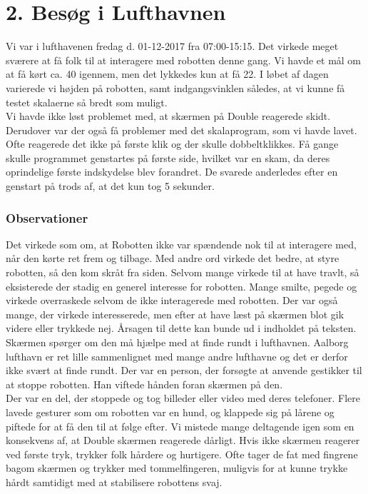 \section{2. Besøg i Lufthavnen}
\label{TestAfSkalaLufthavnsBesog}
%
Vi var i lufthavenen fredag d. 01-12-2017 fra 07:00-15:15. Det virkede meget sværere at få folk til at interagere med robotten denne gang. Vi havde et mål om at få kørt ca. 40 igennem, men det lykkedes kun at få 22. I løbet af dagen varierede vi højden på robotten, samt indgangsvinklen således, at vi kunne få testet skalaerne så bredt som muligt.\\
Vi havde ikke løst problemet med, at skærmen på Double reagerede skidt. Derudover var der også få problemer med det skalaprogram, som vi havde lavet. Ofte reagerede det ikke på første klik og der skulle dobbeltklikkes. Få gange skulle programmet genstartes på første side, hvilket var en skam, da deres oprindelige første indskydelse blev forandret. De svarede anderledes efter en genstart på trods af, at det kun tog 5 sekunder.



\subsubsection{Observationer}
Det virkede som om, at Robotten ikke var spændende nok til at interagere med, når den kørte ret frem og tilbage. Med andre ord virkede det bedre, at styre robotten, så den kom skråt fra siden.
Selvom mange virkede til at have travlt, så eksisterede der stadig en generel interesse for robotten. Mange smilte, pegede og virkede overraskede selvom de ikke interagerede med robotten. Der var også mange, der virkede interesserede, men efter at have læst på skærmen blot gik videre eller trykkede nej. Årsagen til dette kan bunde ud i indholdet på teksten. Skærmen spørger om den må hjælpe med at finde rundt i lufthavnen. Aalborg lufthavn er ret lille sammenlignet med mange andre lufthavne og det er derfor ikke svært at finde rundt. Der var en person, der forsøgte at anvende gestikker til at stoppe robotten. Han viftede hånden foran skærmen på den.\\
Der var en del, der stoppede og tog billeder eller video med deres telefoner. Flere lavede gesturer som om robotten var en hund, og klappede sig på lårene og piftede for at få den til at følge efter. Vi mistede mange deltagende igen som en konsekvens af, at Double skærmen reagerede dårligt. Hvis ikke skærmen reagerer ved første tryk, trykker folk hårdere og hurtigere. Ofte tager de fat med fingrene bagom skærmen og trykker med tommelfingeren, muligvis for at kunne trykke hårdt samtidigt med at stabilisere robottens svaj.

